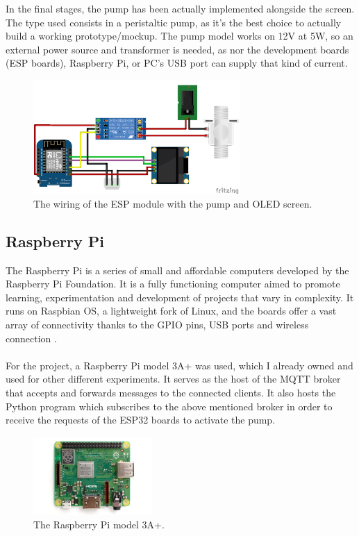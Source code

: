 \documentclass[target=bach,aauheader=,style=]{thud}
\begin{document}
 In the final stages, the pump has been actually implemented alongside the screen. The type used consists in a  peristaltic pump, as it's the best choice to actually build a working prototype/mockup. The pump model works on 12V at 5W, so an external power source and transformer is needed, as nor the development boards (ESP boards), Raspberry Pi, or PC's USB port can supply that kind of current.
 
\begin{figure}[h!]
	\centering
	\includegraphics[width=0.7\textwidth]{esp8266_pump_screen}
	\caption{The wiring of the ESP module with the pump and OLED screen.}
	\label{fig:pump}
\end{figure}

\newpage

\subsection{Raspberry Pi}
The Raspberry Pi is a series of small and affordable computers developed by the Raspberry Pi Foundation. It is a fully functioning computer aimed to promote learning, experimentation and development of projects that vary in complexity. It runs on Raspbian OS, a lightweight fork of Linux, and the boards offer a vast array of connectivity thanks to the GPIO pins, USB ports and wireless connection \cite{raspberrypi}.\\ \\
For the project, a Raspberry Pi model 3A+ was used, which I already owned and used for other different experiments.
It serves as the host of the MQTT broker that accepts and forwards messages to the connected clients.
It also hosts the Python program which subscribes to the above mentioned broker in order to receive the requests of the ESP32 boards to activate the pump.

\begin{figure}[h!]
	\centering
	\includegraphics[width=0.4\textwidth]{raspberrypi3a+}
	\caption{The Raspberry Pi model 3A+.}
	\label{fig:raspberrypi}
\end{figure} 
\end{document}

